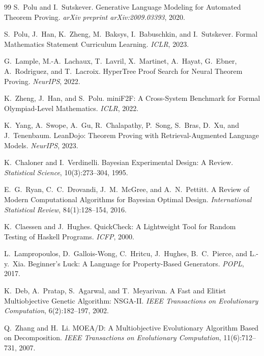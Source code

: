 \documentclass[11pt]{article}
\begin{document}
\begin{thebibliography}{99}
S.~Polu and I.~Sutskever.
\newblock Generative Language Modeling for Automated Theorem Proving.
\newblock \emph{arXiv preprint arXiv:2009.03393}, 2020.

S.~Polu, J.~Han, K.~Zheng, M.~Baksys, I.~Babuschkin, and
I.~Sutskever.
\newblock Formal Mathematics Statement Curriculum Learning.
\newblock \emph{ICLR}, 2023.

G.~Lample, M.-A.~Lachaux, T.~Lavril, X.~Martinet, A.~Hayat,
G.~Ebner, A.~Rodriguez, and T.~Lacroix.
\newblock HyperTree Proof Search for Neural Theorem Proving.
\newblock \emph{NeurIPS}, 2022.

K.~Zheng, J.~Han, and S.~Polu.
\newblock miniF2F: A Cross-System Benchmark for Formal Olympiad-Level
Mathematics.
\newblock \emph{ICLR}, 2022.

K.~Yang, A.~Swope, A.~Gu, R.~Chalapathy, P.~Song, S.~Bras,
D.~Xu, and J.~Tenenbaum.
\newblock LeanDojo: Theorem Proving with Retrieval-Augmented
Language Models.
\newblock \emph{NeurIPS}, 2023.

K.~Chaloner and I.~Verdinelli.
\newblock Bayesian Experimental Design: A Review.
\newblock \emph{Statistical Science}, 10(3):273--304, 1995.

E.~G.~Ryan, C.~C.~Drovandi, J.~M.~McGree, and
A.~N.~Pettitt.
\newblock A Review of Modern Computational Algorithms for Bayesian
Optimal Design.
\newblock \emph{International Statistical Review}, 84(1):128--154,
2016.

K.~Claessen and J.~Hughes.
\newblock QuickCheck: A Lightweight Tool for Random Testing of
Haskell Programs.
\newblock \emph{ICFP}, 2000.

L.~Lampropoulos, D.~Gallois-Wong, C.~Hritcu, J.~Hughes, B.~C.~Pierce,
and L.-y.~Xia.
\newblock Beginner's Luck: A Language for Property-Based Generators.
\newblock \emph{POPL}, 2017.

K.~Deb, A.~Pratap, S.~Agarwal, and T.~Meyarivan.
\newblock A Fast and Elitist Multiobjective Genetic Algorithm:
NSGA-II.
\newblock \emph{IEEE Transactions on Evolutionary Computation},
6(2):182--197, 2002.

Q.~Zhang and H.~Li.
\newblock MOEA/D: A Multiobjective Evolutionary Algorithm Based on
Decomposition.
\newblock \emph{IEEE Transactions on Evolutionary Computation},
11(6):712--731, 2007.


\end{thebibliography}
\end{document}
